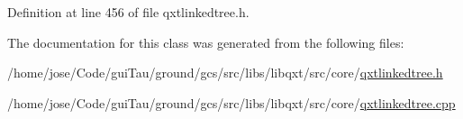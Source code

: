 Definition at line 456 of file qxtlinkedtree.\-h.



The documentation for this class was generated from the following files\-:\begin{DoxyCompactItemize}
\item 
/home/jose/\-Code/gui\-Tau/ground/gcs/src/libs/libqxt/src/core/\hyperlink{qxtlinkedtree_8h}{qxtlinkedtree.\-h}\item 
/home/jose/\-Code/gui\-Tau/ground/gcs/src/libs/libqxt/src/core/\hyperlink{qxtlinkedtree_8cpp}{qxtlinkedtree.\-cpp}\end{DoxyCompactItemize}
